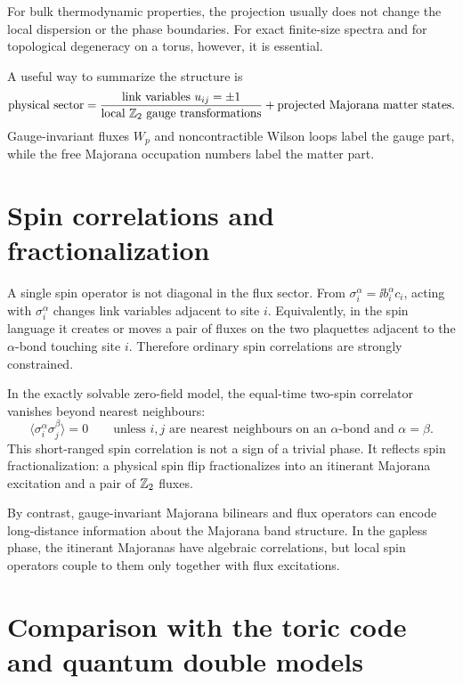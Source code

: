 For bulk thermodynamic properties, the projection usually does not change the
local dispersion or the phase boundaries.  For exact finite-size spectra and
for topological degeneracy on a torus, however, it is essential.

A useful way to summarize the structure is
\begin{equation}
\label{eq:kitaev-sector-label-summary}
    \text{physical sector}
    =
    \frac{\text{link variables }u_{ij}=\pm1}{\text{local }\mathbb{Z}_2\text{ gauge transformations}}
    +
    \text{projected Majorana matter states} .
\end{equation}
Gauge-invariant fluxes \(W_p\) and noncontractible Wilson loops label the gauge
part, while the free Majorana occupation numbers label the matter part.

\section{Spin correlations and fractionalization}
\label{sec:kitaev-spin-correlations-fractionalization}

A single spin operator is not diagonal in the flux sector.  From
\(\sigma_i^\alpha=\ii b_i^\alpha c_i\), acting with \(\sigma_i^\alpha\) changes
link variables adjacent to site \(i\).  Equivalently, in the spin language it
creates or moves a pair of fluxes on the two plaquettes adjacent to the
\(\alpha\)-bond touching site \(i\).  Therefore ordinary spin correlations are
strongly constrained.

In the exactly solvable zero-field model, the equal-time two-spin correlator
vanishes beyond nearest neighbours:
\begin{equation}
\label{eq:kitaev-spin-correlation-range}
    \langle \sigma_i^\alpha\sigma_j^\beta\rangle=0
    \qquad
    \text{unless } i,j \text{ are nearest neighbours on an }\alpha\text{-bond}
    \text{ and }\alpha=\beta .
\end{equation}
This short-ranged spin correlation is not a sign of a trivial phase.  It reflects
spin fractionalization: a physical spin flip fractionalizes into an itinerant
Majorana excitation and a pair of \(\mathbb{Z}_2\) fluxes.

By contrast, gauge-invariant Majorana bilinears and flux operators can encode
long-distance information about the Majorana band structure.  In the gapless
phase, the itinerant Majoranas have algebraic correlations, but local spin
operators couple to them only together with flux excitations.

\section{Comparison with the toric code and quantum double models}
\label{sec:kitaev-comparison-toric-code-quantum-double}

